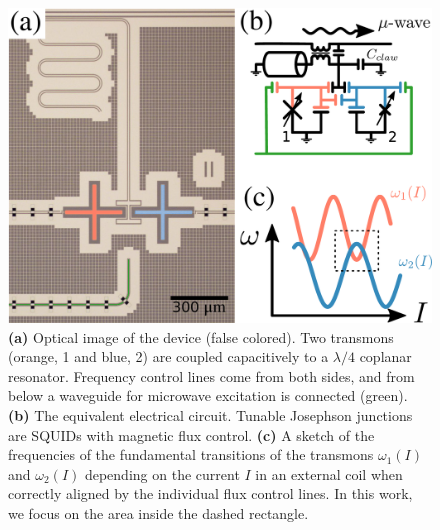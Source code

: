 \documentclass[%
 aps, prx,
 amsmath,amssymb,
 reprint,%
superscriptaddress
]{revtex4-2}
\begin{document}
\begin{figure}
	\includegraphics[width=\linewidth]{experiment_2}
	\caption{\textbf{(a)} Optical image of 
		the device (false colored). Two transmons 
		(orange, 1 and blue, 2) are coupled 
		capacitively to a $\lambda/4$ coplanar 
		resonator. Frequency control lines come from 
		both sides, and from below a waveguide for 
		microwave excitation  is connected (green). 
		\textbf{(b)} The equivalent electrical 
		circuit. Tunable Josephson junctions are 
		SQUIDs with magnetic flux control. 
		\textbf{(c)} A sketch of the frequencies of the fundamental 
		transitions of the transmons $\omega_1(I)$ 
		and $\omega_2(I)$ depending on the current 
		$I$ in an external coil when correctly 
		aligned by the individual flux control lines. 
		In this work, we focus on the area inside the 
		dashed rectangle.}
	\label{fig:experiment}
\end{figure}
\end{document}
